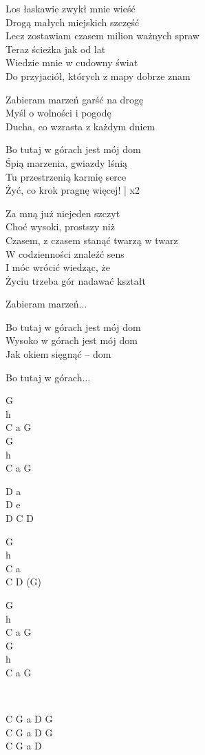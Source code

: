 \begin{textn}
    Los łaskawie zwykł mnie wieść\\
    Drogą małych miejskich szczęść\\
    Lecz zostawiam czasem milion ważnych spraw\\
    Teraz ścieżka jak od lat\\
    Wiedzie mnie w cudowny świat\\
    Do przyjaciół, których z mapy dobrze znam

    \vin Zabieram marzeń garść na drogę\\
    \vin Myśl o wolności i pogodę\\
    \vin Ducha, co wzrasta z każdym dniem

    \vin Bo tutaj w górach jest mój dom\\
    \vin Śpią marzenia, gwiazdy lśnią\\
    \vin Tu przestrzenią karmię serce\\
    \vin Żyć, co krok pragnę więcej! | x2

    Za mną już niejeden szczyt\\
    Choć wysoki, prostszy niż\\
    Czasem, z czasem stanąć twarzą w twarz\\
    W codzienności znaleźć sens\\
    I móc wrócić wiedząc, że\\
    Życiu trzeba gór nadawać kształt

    \vin Zabieram marzeń...

    \vin Bo tutaj w górach jest mój dom\\
    \vin Wysoko w górach jest mój dom\\
    \vin Jak okiem sięgnąć – dom
    
    \vin Bo tutaj w górach...
\end{textn}
\begin{chordw}
    G\\
    h\\
    C a G\\
    G\\
    h\\
    C a G

    D a\\
    D e\\
    D C D

    G\\
    h\\
    C a\\
    C D (G)
    
    G\\
    h\\
    C a G\\
    G\\
    h\\
    C a G
    
    ~
    
    C G a D G\\
    C G a D G\\
    C G a D
\end{chordw}